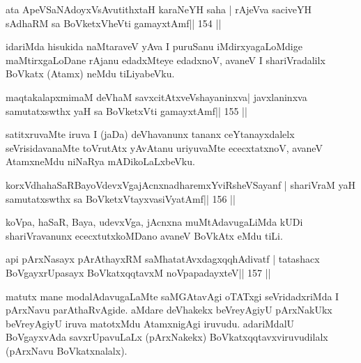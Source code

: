 \begin{shl}
ata ApeVSaNAdoyxV\s sAvutithxtaH karaNeYH saha |
rAjeVva saciveYH sAdhaRM sa BoVketxVheVti gamayxtAmf\hfill || 154 ||
\end{shl}

\begin{artha}
idariMda hisukida naMtaraveV yAva I puruSanu iMdirxyagaLoMdige maMtirxgaLoDane rAjanu edadxMteye edadxnoV, avaneV I shariVradalilx BoVkatx (Atamx) neMdu tiLiyabeVku.
\end{artha}

\begin{shl}
maqtakalapxmimaM deVhaM savxcitAtxveVshayaninxva\footnotemark[7] |
javxlaninxva samutatxswthx yaH sa BoVketxVti gamayxtAmf\hfill || 155 ||
\end{shl}

\begin{artha}
satitxruvaMte iruva I (jaDa) deVhavanunx tananx ceYtanayxdalelx  seVrisidavanaMte toVrutAtx yAvAtanu uriyuvaMte ececxtatxnoV, avaneV AtamxneMdu niNaRya mADikoLaLxbeVku.
\end{artha}

\begin{shl}
korxVdhahaSaRBayoVdevxVgajAcnxnadharemxYviRsheVSayanf |
shariVraM yaH samutatxswthx sa BoVketxVtayxvasiVyatAmf\hfill || 156 ||
\end{shl}

\begin{artha}
koVpa, haSaR, Baya, udevxVga, jAcnxna muMtAdavugaLiMda kUDi 
shariVravanunx ececxtutxkoMDano avaneV BoVkAtx eMdu tiLi.
\end{artha}


\begin{shl}
api pArxNasayx pArAthayxRM saMhatatAvxdagxqqhAdivatf |
tatashacx BoVgayxrUpasayx BoVkatxqqtavxM noVpapadayxteV\hfill || 157 ||
\end{shl}

\begin{artha}
matutx mane modalAdavugaLaMte saMGAtavAgi oTATxgi seVridadxriMda I  pArxNavu parAthaRvAgide. aMdare deVhakekx beVreyAgiyU pArxNakUkx  beVreyAgiyU iruva matotxMdu AtamxnigAgi iruvudu. adariMdalU BoVgayxvAda savxrUpavuLaLx (pArxNakekx) BoVkatxqqtavxviruvudilalx (pArxNavu BoVkatxnalalx).
\end{artha}

